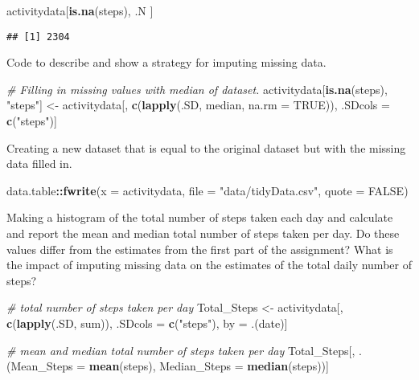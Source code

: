 \documentclass[
]{article}
\newenvironment{Shaded}{\begin{snugshade}}{\end{snugshade}}
\newcommand{\CommentTok}[1]{\textcolor[rgb]{0.56,0.35,0.01}{\textit{#1}}}
\newcommand{\DataTypeTok}[1]{\textcolor[rgb]{0.13,0.29,0.53}{#1}}
\newcommand{\KeywordTok}[1]{\textcolor[rgb]{0.13,0.29,0.53}{\textbf{#1}}}
\newcommand{\NormalTok}[1]{#1}
\newcommand{\OperatorTok}[1]{\textcolor[rgb]{0.81,0.36,0.00}{\textbf{#1}}}
\newcommand{\OtherTok}[1]{\textcolor[rgb]{0.56,0.35,0.01}{#1}}
\newcommand{\StringTok}[1]{\textcolor[rgb]{0.31,0.60,0.02}{#1}}
\begin{document}
\begin{Shaded}
\begin{Highlighting}[]
\NormalTok{activitydata[}\KeywordTok{is.na}\NormalTok{(steps), .N ]}
\end{Highlighting}
\end{Shaded}

\begin{verbatim}
## [1] 2304
\end{verbatim}

Code to describe and show a strategy for imputing missing data.

\begin{Shaded}
\begin{Highlighting}[]
\CommentTok{# Filling in missing values with median of dataset. }
\NormalTok{activitydata[}\KeywordTok{is.na}\NormalTok{(steps), }\StringTok{"steps"}\NormalTok{] <-}\StringTok{ }\NormalTok{activitydata[, }\KeywordTok{c}\NormalTok{(}\KeywordTok{lapply}\NormalTok{(.SD, median, }\DataTypeTok{na.rm =} \OtherTok{TRUE}\NormalTok{)), .SDcols =}\StringTok{ }\KeywordTok{c}\NormalTok{(}\StringTok{"steps"}\NormalTok{)]}
\end{Highlighting}
\end{Shaded}

Creating a new dataset that is equal to the original dataset but with
the missing data filled in.

\begin{Shaded}
\begin{Highlighting}[]
\NormalTok{data.table}\OperatorTok{::}\KeywordTok{fwrite}\NormalTok{(}\DataTypeTok{x =}\NormalTok{ activitydata, }\DataTypeTok{file =} \StringTok{"data/tidyData.csv"}\NormalTok{, }\DataTypeTok{quote =} \OtherTok{FALSE}\NormalTok{)}
\end{Highlighting}
\end{Shaded}

Making a histogram of the total number of steps taken each day and
calculate and report the mean and median total number of steps taken per
day. Do these values differ from the estimates from the first part of
the assignment? What is the impact of imputing missing data on the
estimates of the total daily number of steps?

\begin{Shaded}
\begin{Highlighting}[]
\CommentTok{# total number of steps taken per day}
\NormalTok{Total_Steps <-}\StringTok{ }\NormalTok{activitydata[, }\KeywordTok{c}\NormalTok{(}\KeywordTok{lapply}\NormalTok{(.SD, sum)), .SDcols =}\StringTok{ }\KeywordTok{c}\NormalTok{(}\StringTok{"steps"}\NormalTok{), by =}\StringTok{ }\NormalTok{.(date)] }

\CommentTok{# mean and median total number of steps taken per day}
\NormalTok{Total_Steps[, .(}\DataTypeTok{Mean_Steps =} \KeywordTok{mean}\NormalTok{(steps), }\DataTypeTok{Median_Steps =} \KeywordTok{median}\NormalTok{(steps))]}
\end{Highlighting}
\end{Shaded}
\end{document}

